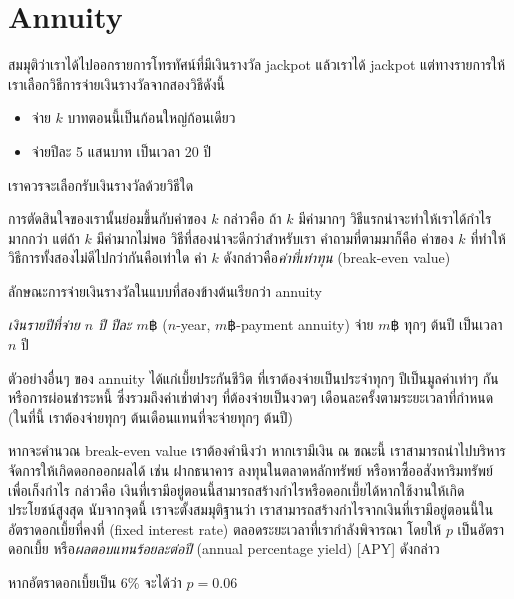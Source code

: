 \section{Annuity}

สมมุติว่าเราได้ไปออกรายการโทรทัศน์ที่มีเงินรางวัล jackpot แล้วเราได้ jackpot แต่ทางรายการให้เราเลือกวิธีการจ่ายเงินรางวัลจากสองวิธีดังนี้
\begin{itemize}
\item จ่าย $k$ บาทตอนนี้เป็นก้อนใหญ่ก้อนเดียว
\item จ่ายปีละ 5 แสนบาท เป็นเวลา 20 ปี
\end{itemize}
เราควรจะเลือกรับเงินรางวัลด้วยวิธีใด

การตัดสินใจของเรานั้นย่อมขึ้นกับค่าของ $k$ กล่าวคือ ถ้า $k$ มีค่ามากๆ วิธีแรกน่าจะทำให้เราได้กำไรมากกว่า แต่ถ้า $k$ มีค่ามากไม่พอ วิธีที่สองน่าจะดีกว่าสำหรับเรา \enskip คำถามที่ตามมาก็คือ ค่าของ $k$ ที่ทำให้วิธีการทั้งสองไม่ดีไปกว่ากันคือเท่าใด \enskip ค่า $k$ ดังกล่าวคือ\emph{ค่าที่เท่าทุน} (break-even value)

ลักษณะการจ่ายเงินรางวัลในแบบที่สองข้างต้นเรียกว่า annuity
\begin{definition}
\emph{เงินรายปีที่จ่าย $n$ ปี ปีละ $m฿$} ($n$-year, $m฿$-payment annuity) จ่าย $m฿$ ทุกๆ ต้นปี เป็นเวลา $n$ ปี
\end{definition}
ตัวอย่างอื่นๆ ของ annuity ได้แก่เบี้ยประกันชีวิต ที่เราต้องจ่ายเป็นประจำทุกๆ ปีเป็นมูลค่าเท่าๆ กัน หรือการผ่อนชำระหนี้ ซึ่งรวมถึงค่าเช่าต่างๆ ที่ต้องจ่ายเป็นงวดๆ เดือนละครั้งตามระยะเวลาที่กำหนด (ในที่นี้ เราต้องจ่ายทุกๆ ต้นเดือนแทนที่จะจ่ายทุกๆ ต้นปี)

หากจะคำนวณ break-even value เราต้องคำนึงว่า หากเรามีเงิน ณ ขณะนี้ เราสามารถนำไปบริหารจัดการให้เกิดดอกออกผลได้ เช่น ฝากธนาคาร ลงทุนในตลาดหลักทรัพย์ หรือหาซื้ออสังหาริมทรัพย์เพื่อเก็งกำไร \enskip กล่าวคือ เงินที่เรามีอยู่ตอนนี้สามารถสร้างกำไรหรือดอกเบี้ยได้หากใช้งานให้เกิดประโยชน์สูงสุด \enskip นับจากจุดนี้ เราจะตั้งสมมุติฐานว่า เราสามารถสร้างกำไรจากเงินที่เรามีอยู่ตอนนี้ในอัตราดอกเบี้ยที่คงที่ (fixed interest rate) ตลอดระยะเวลาที่เรากำลังพิจารณา โดยให้ $p$ เป็นอัตราดอกเบี้ย หรือ\emph{ผลตอบแทนร้อยละต่อปี} (annual percentage yield) [APY] ดังกล่าว
%
\begin{example}
หากอัตราดอกเบี้ยเป็น 6\% จะได้ว่า $p=0.06$
\end{example}

